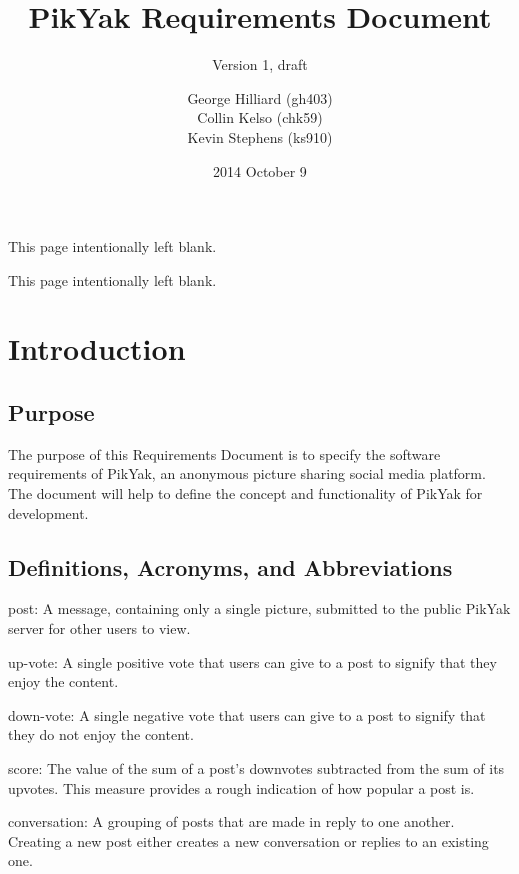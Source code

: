 \documentclass[11pt]{scrartcl}
\title{PikYak Requirements Document}
\subtitle{Version 1, draft}
\author{
    George Hilliard (gh403) \\
    Collin Kelso (chk59) \\
    Kevin Stephens (ks910)
}
\date{2014 October 9}
\newcommand*{\blankpage}{%
\clearpage
\vspace*{\fill}
\centerline{This page intentionally left blank.}
\vspace{\fill}
\clearpage}
\let\stdsection\section
\renewcommand\section{\newpage\stdsection}
\begin{document}

\maketitle

\blankpage

\tableofcontents

\blankpage


\section{Introduction}
    \subsection{Purpose}
        The purpose of this Requirements Document is to specify the software requirements of PikYak, an anonymous picture sharing social media platform.
        The document will help to define the concept and functionality of PikYak for development.

    \subsection{Definitions, Acronyms, and Abbreviations}
        \begin{description*}
            \item[post:] A message, containing only a single picture, submitted to the public PikYak server for other users to view.

            \item[up-vote:] A single positive vote that users can give to a post to signify that they enjoy the content.

            \item[down-vote:] A single negative vote that users can give to a post to signify that they do not enjoy the content.

            \item[score:] The value of the sum of a post's downvotes subtracted from the sum of its upvotes.
                          This measure provides a rough indication of how popular a post is.

            \item[conversation:] A grouping of posts that are made in reply to one another.
                                 Creating a new post either creates a new conversation or replies to an existing one.
        \end{description*}
\end{document}
